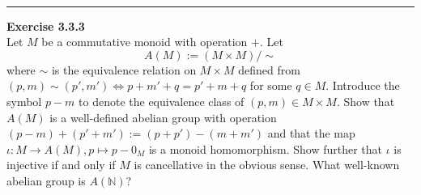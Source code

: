 \documentclass[a4paper, 11pt]{article}
\newenvironment{problem}[2][Exercise]
    { \begin{mdframed}[backgroundcolor=gray!20] \textbf{#1 #2} \\}
    {  \end{mdframed}}
\begin{document}
\\ 
\noindent\rule{7in}{2.8pt}
\begin{problem}{3.3.3}
Let \(M\) be a commutative monoid with operation \(+\). Let 
$$A(M):=(M\times M)/\sim$$
where \(\sim\) is the equivalence relation on \(M\times M\) defined from \((p,m)\sim (p',m')\Leftrightarrow p+m'+q=p'+m+q\) for some \(q\in M\). 
Introduce the symbol \(p-m\) to denote the equivalence class of \((p,m)\in M\times M\). Show that \(A(M)\) is a well-defined abelian group with operation 
\((p-m)+(p'+m'):=(p+p')-(m+m')\) and that the map \(\iota:M\rightarrow A(M), p\mapsto p-0_M\) is a monoid homomorphism. Show further that \(\iota\) is injective 
if and only if \(M\) is cancellative in the obvious sense. What well-known abelian group is \(A(\mathbb{N})\)?
\end{problem}
\end{document}

